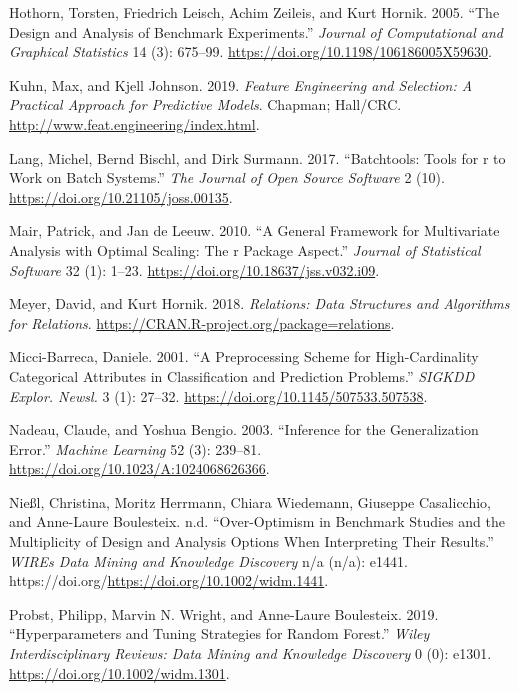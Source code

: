 \documentclass[smallextended]{svjour3}       %
\newlength{\cslhangindent}
\newlength{\cslentryspacingunit} %
\newenvironment{CSLReferences}[2] %
 {%
  \setlength{\parindent}{0pt}
  \ifodd #1
  \let\oldpar\par
  \def\par{\hangindent=\cslhangindent\oldpar}
  \fi
  \setlength{\parskip}{#2\cslentryspacingunit}
 }%
 {}
\begin{document}
\begin{CSLReferences}{1}{0}
\leavevmode{}%
Hothorn, Torsten, Friedrich Leisch, Achim Zeileis, and Kurt Hornik. 2005. {``The Design and Analysis of Benchmark Experiments.''} \emph{Journal of Computational and Graphical Statistics} 14 (3): 675--99. \url{https://doi.org/10.1198/106186005X59630}.

\leavevmode{}%
Kuhn, Max, and Kjell Johnson. 2019. \emph{Feature Engineering and Selection: A Practical Approach for Predictive Models}. Chapman; Hall/CRC. \url{http://www.feat.engineering/index.html}.

\leavevmode{}%
Lang, Michel, Bernd Bischl, and Dirk Surmann. 2017. {``Batchtools: Tools for r to Work on Batch Systems.''} \emph{The Journal of Open Source Software} 2 (10). \url{https://doi.org/10.21105/joss.00135}.

\leavevmode{}%
Mair, Patrick, and Jan de Leeuw. 2010. {``A General Framework for Multivariate Analysis with Optimal Scaling: The r Package Aspect.''} \emph{Journal of Statistical Software} 32 (1): 1--23. \url{https://doi.org/10.18637/jss.v032.i09}.

\leavevmode{}%
Meyer, David, and Kurt Hornik. 2018. \emph{Relations: Data Structures and Algorithms for Relations}. \url{https://CRAN.R-project.org/package=relations}.

\leavevmode{}%
Micci-Barreca, Daniele. 2001. {``A Preprocessing Scheme for High-Cardinality Categorical Attributes in Classification and Prediction Problems.''} \emph{SIGKDD Explor. Newsl.} 3 (1): 27--32. \url{https://doi.org/10.1145/507533.507538}.

\leavevmode{}%
Nadeau, Claude, and Yoshua Bengio. 2003. {``Inference for the Generalization Error.''} \emph{Machine Learning} 52 (3): 239--81. \url{https://doi.org/10.1023/A:1024068626366}.

\leavevmode{}%
Nießl, Christina, Moritz Herrmann, Chiara Wiedemann, Giuseppe Casalicchio, and Anne-Laure Boulesteix. n.d. {``Over-Optimism in Benchmark Studies and the Multiplicity of Design and Analysis Options When Interpreting Their Results.''} \emph{WIREs Data Mining and Knowledge Discovery} n/a (n/a): e1441. https://doi.org/\url{https://doi.org/10.1002/widm.1441}.

\leavevmode{}%
Probst, Philipp, Marvin N. Wright, and Anne-Laure Boulesteix. 2019. {``Hyperparameters and Tuning Strategies for Random Forest.''} \emph{Wiley Interdisciplinary Reviews: Data Mining and Knowledge Discovery} 0 (0): e1301. \url{https://doi.org/10.1002/widm.1301}.


\end{CSLReferences}
\end{document}
